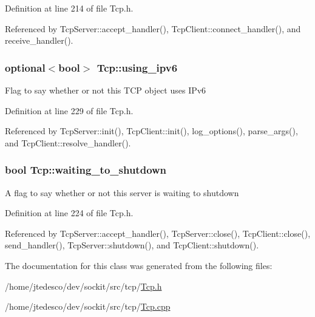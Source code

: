 Definition at line 214 of file Tcp.h.



Referenced by TcpServer::accept\_\-handler(), TcpClient::connect\_\-handler(), and receive\_\-handler().

\hypertarget{classTcp_a395b2458742a84d78c1107ac8b59a7a8}{
\subsubsection[{using\_\-ipv6}]{\setlength{\rightskip}{0pt plus 5cm}optional$<$bool$>$ {\bf Tcp::using\_\-ipv6}}}
\label{classTcp_a395b2458742a84d78c1107ac8b59a7a8}
Flag to say whether or not this TCP object uses IPv6 

Definition at line 229 of file Tcp.h.



Referenced by TcpServer::init(), TcpClient::init(), log\_\-options(), parse\_\-args(), and TcpClient::resolve\_\-handler().

\hypertarget{classTcp_a96b0558a6ce522708bfd06cf1e6e45ba}{
\subsubsection[{waiting\_\-to\_\-shutdown}]{\setlength{\rightskip}{0pt plus 5cm}bool {\bf Tcp::waiting\_\-to\_\-shutdown}}}
\label{classTcp_a96b0558a6ce522708bfd06cf1e6e45ba}
A flag to say whether or not this server is waiting to shutdown 

Definition at line 224 of file Tcp.h.



Referenced by TcpServer::accept\_\-handler(), TcpServer::close(), TcpClient::close(), send\_\-handler(), TcpServer::shutdown(), and TcpClient::shutdown().



The documentation for this class was generated from the following files:\begin{DoxyCompactItemize}
\item 
/home/jtedesco/dev/sockit/src/tcp/\hyperlink{Tcp_8h}{Tcp.h}\item 
/home/jtedesco/dev/sockit/src/tcp/\hyperlink{Tcp_8cpp}{Tcp.cpp}\end{DoxyCompactItemize}
